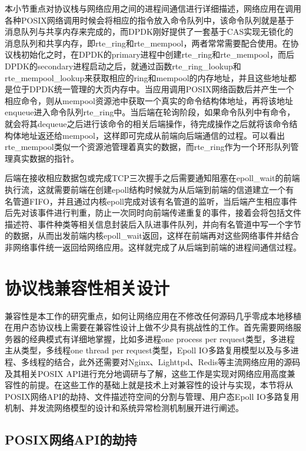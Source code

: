 本小节重点对协议栈与网络应用之间的进程间通信进行详细描述，网络应用在调用各种POSIX网络调用时候会将相应的指令放入命令队列中，该命令队列就是基于消息队列与共享内存来完成的，而DPDK刚好提供了一套基于CAS实现无锁化的消息队列和共享内存，即rte\_ring和rte\_mempool，两者常常需要配合使用。在协议栈初始化之时，在DPDK的primary进程中创建rte\_ring和rte\_mempool，而后DPDK的secondary进程启动之后，就通过函数rte\_ring\_lookup和rte\_mempool\_lookup来获取相应的ring和mempool的内存地址，并且这些地址都是位于DPDK统一管理的大页内存中。当应用调用POSIX网络函数后并产生一个相应命令，则从mempool资源池中获取一个真实的命令结构体地址，再将该地址enqueue进入命令队列rte\_ring中。当后端在轮询阶段，如果命令队列中有命令，就会将其dequeue之后进行该命令的相关后端操作，待完成操作之后就将该命令结构体地址返还给mempool，这样即可完成从前端向后端通信的过程。可以看出rte\_mempool类似一个资源池管理着真实的数据，而rte\_ring作为一个环形队列管理真实数据的指针。

后端在接收相应数据包或完成TCP三次握手之后需要通知阻塞在epoll\_wait的前端执行流，这就需要前端在创建epoll结构时候就为从后端到前端的信道建立一个有名管道FIFO，并且通过内核epoll完成对该有名管道的监听，当后端产生相应事件后先对该事件进行判重，防止一次同时向前端传递重复的事件，接着会将包括文件描述符、事件种类等相关信息封装后入队进事件队列，并向有名管道中写一个字节的数据，从而出发前端内核epoll\_wait返回，这样在前端再对这些网络事件并结合非网络事件统一返回给网络应用。这样就完成了从后端到前端的进程间通信过程。

\section{协议栈兼容性相关设计}

兼容性是本工作的研究重点，如何让网络应用在不修改任何源码几乎零成本地移植在用户态协议栈上需要在兼容性设计上做不少具有挑战性的工作。首先需要网络服务器的经典模式有详细地掌握，比如多进程one process per request类型，多进程主从类型，多线程one thread per request类型，Epoll IO多路复用模型以及与多进程、多线程的结合，此外还需要对Nginx、Lighttpd、Redis等主流网络应用的源码及其相关POSIX API进行充分地调研与了解，这些工作是实现对网络应用高度兼容性的前提。在这些工作的基础上就是技术上对兼容性的设计与实现，本节将从POSIX网络API的劫持、文件描述符空间的分割与管理、用户态Epoll IO多路复用机制、并发流网络模型的设计和系统异常检测机制展开进行阐述。

\subsection{POSIX网络API的劫持}

